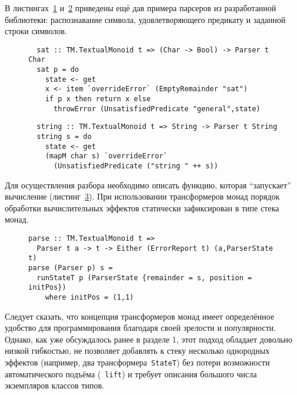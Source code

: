   В листингах~\ref{listing:mtlParserSat} и~\ref{listing:mtlParserString} приведены ещё дав примера парсеров из разработанной библиотеки: 
  распознавание символа, удовлетворяющего предикату и заданной строки символов.

  \begin{figure}[h]
  \begin{lstlisting}
  sat :: TM.TextualMonoid t => (Char -> Bool) -> Parser t Char
  sat p = do
    state <- get
    x <- item `overrideError` (EmptyRemainder "sat")
    if p x then return x else 
      throwError (UnsatisfiedPredicate "general",state)
  \end{lstlisting}
  \caption{}
  \label{listing:mtlParserSat}
  \end{figure}

  \begin{figure}[h]
  \begin{lstlisting}
  string :: TM.TextualMonoid t => String -> Parser t String
  string s = do
    state <- get
    (mapM char s) `overrideError` 
      (UnsatisfiedPredicate ("string " ++ s))
  \end{lstlisting}
  \caption{}
  \label{listing:mtlParserString}
  \end{figure}

  Для осуществления разбора необходимо описать функцию, которая ``запускает''
  вычисление (листинг~\ref{listing:mtlParseRun}). При использовании трансформеров 
  монад порядок обработки вычислительных эффектов статически зафиксирован в 
  типе стека монад. 
  
  \begin{figure}[h]
  \begin{lstlisting}
parse :: TM.TextualMonoid t => 
  Parser t a -> t -> Either (ErrorReport t) (a,ParserState t)
parse (Parser p) s = 
  runStateT p (ParserState {remainder = s, position = initPos})
    where initPos = (1,1)
  \end{lstlisting}
  \caption{}
  \label{listing:mtlParseRun}
  \end{figure}


  Следует сказать, что концепция трансформеров монад имеет определённое удобство 
  для программирования благодаря своей зрелости и популярности. Однако, как уже
  обсуждалось ранее в разделе 1, этот подход обладает довольно низкой гибкостью, 
  не позволяет добавлять к стеку несколько однородных эффектов (например, два 
  трансформера~\lstinline{StateT}) без потери возможности автоматического 
  подъёма (~\lstinline{lift}) и требует описания большого числа экземпляров классов 
  типов. 

